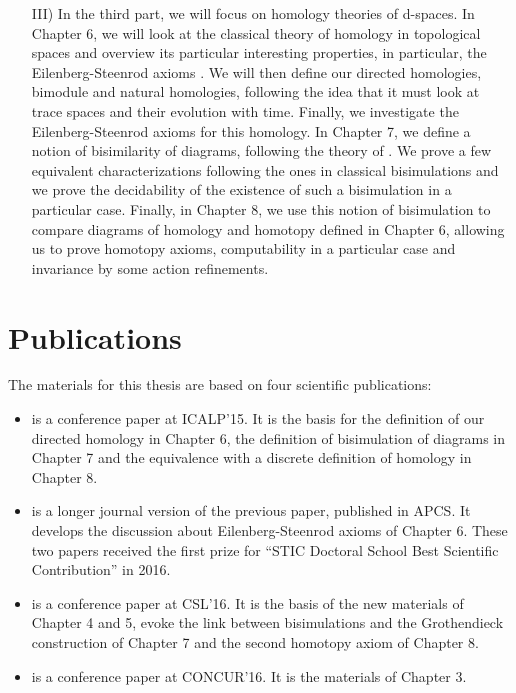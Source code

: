 \begin{itemize}
	\item[III)] In the third part, we will focus on homology theories of d-spaces. In Chapter 6, we will look at the classical theory of homology in topological spaces and overview its particular interesting properties, in particular, the Eilenberg-Steenrod axioms \cite{eilenberg45}. We will then define our directed homologies, bimodule and natural homologies, following the idea that it must look at trace spaces and their evolution with time. Finally, we investigate the Eilenberg-Steenrod axioms for this homology. In Chapter 7, we define a notion of bisimilarity of diagrams, following the theory of \cite{joyal96}. We prove a few equivalent characterizations following the ones in classical bisimulations and we prove the decidability of the existence of such a bisimulation in a particular case. Finally, in Chapter 8, we use this notion of bisimulation to compare diagrams of homology and homotopy defined in Chapter 6, allowing us to prove homotopy axioms, computability in a particular case and invariance by some action refinements.
\end{itemize}



\section*{Publications}

The materials for this thesis are based on four scientific publications:
\begin{itemize}
	\item \cite{dubut15} is a conference paper at ICALP'15. It is the basis for the definition of our directed homology in Chapter 6, the definition of bisimulation of diagrams in Chapter 7 and the equivalence with a discrete definition of homology in Chapter 8.
	\item \cite{dubut16c} is a longer journal version of the previous paper, published in APCS. It develops the discussion about Eilenberg-Steenrod axioms of Chapter 6. These two papers received the first prize for ``STIC Doctoral School Best Scientific Contribution'' in 2016.
	\item \cite{dubut16b} is a conference paper at CSL'16. It is the basis of the new materials of Chapter 4 and 5, evoke the link between bisimulations and the Grothendieck construction of Chapter 7 and the second homotopy axiom of Chapter 8.
	\item \cite{dubut16} is a conference paper at CONCUR'16. It is the materials of Chapter 3.
\end{itemize}





